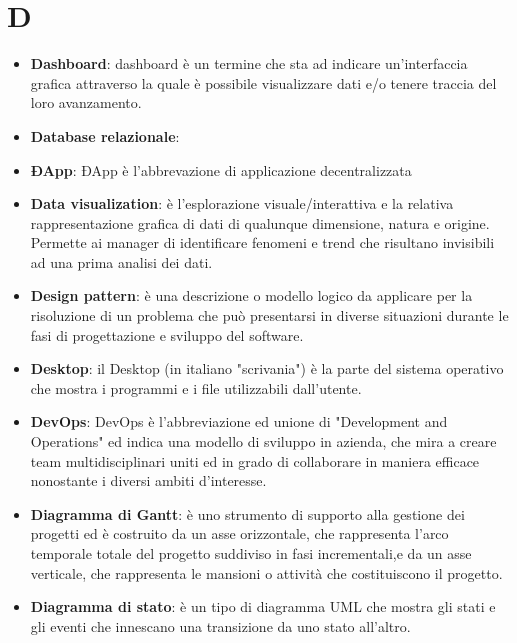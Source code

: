 \documentclass[a4paper, oneside, openany]{article}
\begin{document}
\section{D}
\begin{itemize}
\item \textbf{Dashboard}: dashboard è un termine che sta ad indicare un'interfaccia grafica attraverso la quale è possibile visualizzare dati e/o tenere traccia del loro avanzamento.
\item \textbf{Database relazionale}:
\item \textbf{ÐApp}: ÐApp è l'abbrevazione di applicazione decentralizzata
\item \textbf{Data visualization}: è l'esplorazione visuale/interattiva e la relativa rappresentazione grafica di dati di qualunque dimensione, natura e origine. Permette ai manager di identificare fenomeni e trend che risultano invisibili ad una prima analisi dei dati.
\item \textbf{Design pattern}: è una descrizione o modello logico da applicare per la risoluzione di un problema che può presentarsi in diverse situazioni durante le fasi di progettazione e sviluppo del software.
\item \textbf{Desktop}: il Desktop (in italiano "scrivania") è la parte del sistema operativo che mostra i programmi e i file utilizzabili dall'utente.
\item \textbf{DevOps}: DevOps è l'abbreviazione ed unione di "Development and Operations" ed indica una modello di sviluppo in azienda, che mira a creare team multidisciplinari uniti ed in grado di collaborare in maniera efficace nonostante i diversi ambiti d'interesse.
\item \textbf{Diagramma di Gantt}: è uno strumento di supporto alla gestione dei progetti ed è costruito da un asse orizzontale, che rappresenta l'arco temporale totale del progetto suddiviso in fasi incrementali,e da un asse verticale, che rappresenta le mansioni o attività che costituiscono il progetto.
\item \textbf{Diagramma di stato}: è un tipo di diagramma UML che mostra gli stati e gli eventi che innescano una transizione da uno stato all'altro.
\end{itemize}
\end{document}
